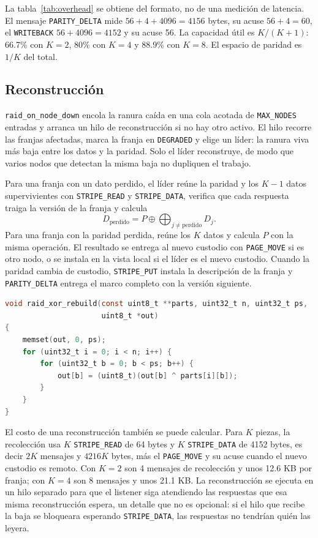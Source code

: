 \documentclass[11pt,spanish]{article}
\begin{document}
La tabla~\ref{tab:overhead} se obtiene del formato, no de una medición de latencia. El mensaje \texttt{PARITY\_DELTA} mide $56 + 4 + 4096 = 4156$ bytes, su acuse $56 + 4 = 60$, el \texttt{WRITEBACK} $56 + 4096 = 4152$ y su acuse 56. La capacidad útil es $K/(K+1)$: 66.7\% con $K=2$, 80\% con $K=4$ y 88.9\% con $K=8$. El espacio de paridad es $1/K$ del total.

\subsection{Reconstrucción}

\texttt{raid\_on\_node\_down} encola la ranura caída en una cola acotada de \texttt{MAX\_NODES} entradas y arranca un hilo de reconstrucción si no hay otro activo. El hilo recorre las franjas afectadas, marca la franja en \texttt{DEGRADED} y elige un líder: la ranura viva más baja entre los datos y la paridad. Solo el líder reconstruye, de modo que varios nodos que detectan la misma baja no dupliquen el trabajo.

Para una franja con un dato perdido, el líder reúne la paridad y los $K-1$ datos supervivientes con \texttt{STRIPE\_READ} y \texttt{STRIPE\_DATA}, verifica que cada respuesta traiga la versión de la franja y calcula
\begin{equation}
D_{\text{perdido}} = P \oplus \bigoplus_{j \ne \text{perdido}} D_j.
\end{equation}
Para una franja con la paridad perdida, reúne los $K$ datos y calcula $P$ con la misma operación. El resultado se entrega al nuevo custodio con \texttt{PAGE\_MOVE} si es otro nodo, o se instala en la vista local si el líder es el nuevo custodio. Cuando la paridad cambia de custodio, \texttt{STRIPE\_PUT} instala la descripción de la franja y \texttt{PARITY\_DELTA} entrega el marco completo con la versión siguiente.

\begin{lstlisting}[language=C, caption={Reconstrucción XOR de una pieza a partir de las supervivientes.}, label={lst:xor}]
void raid_xor_rebuild(const uint8_t **parts, uint32_t n, uint32_t ps,
                      uint8_t *out)
{
    memset(out, 0, ps);
    for (uint32_t i = 0; i < n; i++) {
        for (uint32_t b = 0; b < ps; b++) {
            out[b] = (uint8_t)(out[b] ^ parts[i][b]);
        }
    }
}
\end{lstlisting}

El costo de una reconstrucción también se puede calcular. Para $K$ piezas, la recolección usa $K$ \texttt{STRIPE\_READ} de 64 bytes y $K$ \texttt{STRIPE\_DATA} de 4152 bytes, es decir $2K$ mensajes y $4216K$ bytes, más el \texttt{PAGE\_MOVE} y su acuse cuando el nuevo custodio es remoto. Con $K=2$ son 4 mensajes de recolección y unos 12.6 KB por franja; con $K=4$ son 8 mensajes y unos 21.1 KB. La reconstrucción se ejecuta en un hilo separado para que el listener siga atendiendo las respuestas que esa misma reconstrucción espera, un detalle que no es opcional: si el hilo que recibe la baja se bloqueara esperando \texttt{STRIPE\_DATA}, las respuestas no tendrían quién las leyera.
\end{document}
